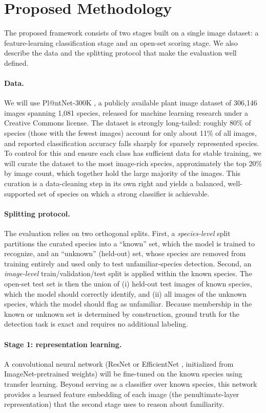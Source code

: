\documentclass[11pt]{article}
\begin{document}
\section{Proposed Methodology}

The proposed framework consists of two stages built on a single image dataset: a feature-learning classification stage and an open-set scoring stage. We also describe the data and the splitting protocol that make the evaluation well defined.

\paragraph{Data.} We will use Pl@ntNet-300K \cite{garcin2021plantnet}, a publicly available plant image dataset of 306{,}146 images spanning 1{,}081 species, released for machine learning research under a Creative Commons license. The dataset is strongly long-tailed: roughly 80\% of species (those with the fewest images) account for only about 11\% of all images, and reported classification accuracy falls sharply for sparsely represented species. To control for this and ensure each class has sufficient data for stable training, we will curate the dataset to the most image-rich species, approximately the top 20\% by image count, which together hold the large majority of the images. This curation is a data-cleaning step in its own right and yields a balanced, well-supported set of species on which a strong classifier is achievable.

\paragraph{Splitting protocol.} The evaluation relies on two orthogonal splits. First, a \emph{species-level} split partitions the curated species into a ``known'' set, which the model is trained to recognize, and an ``unknown'' (held-out) set, whose species are removed from training entirely and used only to test unfamiliar-species detection. Second, an \emph{image-level} train/validation/test split is applied within the known species. The open-set test set is then the union of (i) held-out test images of known species, which the model should correctly identify, and (ii) all images of the unknown species, which the model should flag as unfamiliar. Because membership in the known or unknown set is determined by construction, ground truth for the detection task is exact and requires no additional labeling.

\paragraph{Stage 1: representation learning.} A convolutional neural network (ResNet \cite{he2016resnet} or EfficientNet \cite{tan2019efficientnet}, initialized from ImageNet-pretrained weights) will be fine-tuned on the known species using transfer learning. Beyond serving as a classifier over known species, this network provides a learned feature embedding of each image (the penultimate-layer representation) that the second stage uses to reason about familiarity.
\end{document}
